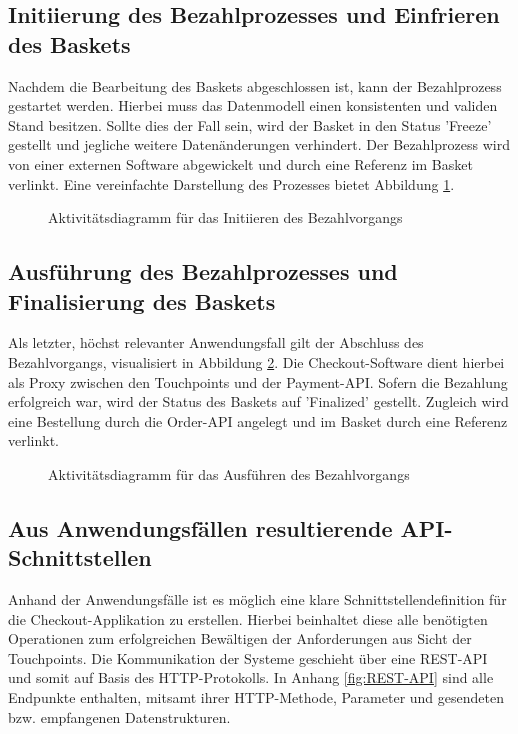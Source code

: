 \subsection{Initiierung des Bezahlprozesses und Einfrieren des Baskets}

Nachdem die Bearbeitung des Baskets abgeschlossen ist, kann der Bezahlprozess gestartet werden. Hierbei muss das Datenmodell einen konsistenten und validen Stand besitzen. Sollte dies der Fall sein, wird der Basket in den Status 'Freeze' gestellt und jegliche weitere Datenänderungen verhindert. Der Bezahlprozess wird von einer externen Software abgewickelt und durch eine Referenz im Basket verlinkt. Eine vereinfachte Darstellung des Prozesses bietet Abbildung \ref{fig:SL-InitPayment}.

\begin{figure}[H]
	\centering
	
	\caption{Aktivitätsdiagramm für das Initiieren des Bezahlvorgangs }
	\label{fig:SL-InitPayment}
\end{figure}

\pagebreak

\subsection{Ausführung des Bezahlprozesses und Finalisierung des Baskets}

Als letzter, höchst relevanter Anwendungsfall gilt der Abschluss des Bezahlvorgangs, visualisiert in Abbildung \ref{fig:SL-ExecPayment}. Die Checkout-Software dient hierbei als Proxy zwischen den Touchpoints und der Payment-API. Sofern die Bezahlung erfolgreich war, wird der Status des Baskets auf 'Finalized' gestellt. Zugleich wird eine Bestellung durch die Order-API angelegt und im Basket durch eine Referenz verlinkt.

\begin{figure}[H]
	\centering
	
	\caption{Aktivitätsdiagramm für das Ausführen des Bezahlvorgangs }
	\label{fig:SL-ExecPayment}
\end{figure}

\subsection{Aus Anwendungsfällen resultierende API-Schnittstellen }

Anhand der Anwendungsfälle ist es möglich eine klare Schnittstellendefinition für die Checkout-Applikation zu erstellen. Hierbei beinhaltet diese alle benötigten Operationen zum erfolgreichen Bewältigen der Anforderungen aus Sicht der Touchpoints. Die Kommunikation der Systeme geschieht über eine \acrshort{REST}-API und somit auf Basis des \acrshort{HTTP}-Protokolls. In Anhang \ref{fig:REST-API} sind alle Endpunkte enthalten, mitsamt ihrer HTTP-Methode, Parameter und gesendeten bzw. empfangenen Datenstrukturen.

